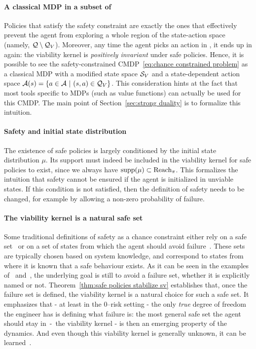 \paragraph{A classical MDP in a subset of \Q} Policies that satisfy the safety constraint are exactly the ones that effectively prevent the agent from exploring a whole region of the state-action space (namely, $\mathcal{Q}\setminus\mathcal{Q}_{V}$). Moreover, any time the agent picks an action in \QV, it ends up in \SV again: the viability kernel is\emph{ positively invariant} under safe policies. Hence, it is possible to see the safety-constrained CMDP~\eqref{eq:chance constrained problem} as a classical MDP with a modified state space ${\mathcal{S}_{V}}$ and a state-dependent action space $\mathcal{A}(s) = \{a\in\mathcal{A}~|~(s, a)\in\mathcal{Q}_{V}\}$. This consideration hints at the fact that most tools specific to MDPs (such as value functions) can actually be used for this CMDP. The main point of Section~\ref{sec:strong duality} is to formalize this intuition.

\paragraph{Safety and initial state distribution} The existence of safe policies is largely conditioned by the initial state distribution $\mu$. Its support must indeed be included in the viability kernel for safe policies to exist, since we always have $\operatorname{supp}(\mu) \subset \operatorname{Reach}_\pi$. This formalizes the intuition that safety cannot be ensured if the agent is initialized in unviable states. If this condition is not satisfied, then the definition of safety needs to be changed, for example by allowing a non-zero probability of failure.

\paragraph{The viability kernel is a natural safe set} Some traditional definitions of safety as a chance constraint either rely on a safe set~\cite{paternain2019safe} or on a set of states from which the agent should avoid failure~\cite{geibel2005risk}. These sets are typically chosen based on system knowledge, and correspond to states from where it is known that a safe behaviour exists. As it can be seen in the examples of~\cite{paternain2019safe} and~\cite{geibel2005risk}, the underlying goal is still to avoid a failure set, whether it is explicitly named or not. Theorem~\ref{thm:safe policies stabilize sv} establishes that, once the failure set is defined, the viability kernel is a natural choice for such a safe set. It emphasizes that - at least in the $0$--risk setting - the only\emph{ true} degree of freedom the engineer has is defining what failure is: the most general safe set the agent should stay in~-~the viability kernel - is then an emerging property of the dynamics. And even though this viability kernel is generally unknown, it can be learned~\cite{heim2020learnable}.

